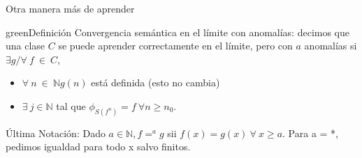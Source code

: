 \documentclass[10pt]{beamer}
\begin{document}
\begin{frame}{Otra manera más de aprender}
	\begin{mybox}{green}{Definición}
	Convergencia semántica en el límite con anomalías: decimos que una clase $C$ se puede aprender correctamente en el límite, pero con $a$ anomalías si $\exists g / \forall\ f\ \in\ C$,
	\begin{itemize}
		\item $\forall\ n\ \in\ \mathbb{N} g(n)$ está definida (esto no cambia)
		\item $\exists\ j \in \mathbb{N}$ tal que $\phi_{S(f^n)} = f\ \forall n \geq n_0$.
	\end{itemize}
	\end{mybox}
	
	

\end{frame}

\begin{frame}{Última}
	Notación: Dado $a \in \mathbb{N}, f =^a g$ sii $f(x) = g(x)\ \forall\ x \geq a$. Para a = *, pedimos igualdad para todo x salvo finitos.
	
	
	
	
	

\end{frame}
\end{document}
